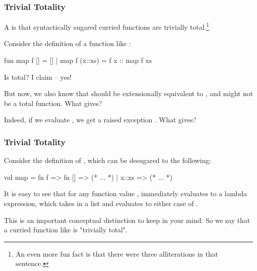 \documentclass[aspectratio=169, handout]{beamer}
\begin{document}
\begin{frame}[fragile]
  \frametitle{Trivial Totality}

  A  is that syntactically sugared curried functions are trivially total.\footnote{
    An even more fun fact is that there were three alliterations in that sentence.
  }

  \pause
  \vspace{\fill}

  Consider the definition of a function like :

  \pause
  \vspace{5pt}

  \begin{codeblock}
    fun map f [] = []
      | map f (x::xs) = f x :: map f xs
  \end{codeblock}

  \pause
  \vspace{\fill}

  Is  total? I claim -- yes!

  \pause
  \vspace{\fill}

  But now, we also know that  should be extensionally
  equivalent to \code{[f 1, f 2, f 3]}, and  might not be a total function.
  What gives?

  \pause
  \vspace{\fill}

  Indeed, if we evaluate , we get a
  raised exception . What gives?
\end{frame}

\begin{frame}[fragile]
  \frametitle{Trivial Totality}


  \pause
  \vspace{\fill}

  Consider the definition of , which can be desugared to the following:
  \begin{codeblock}
    val map = fn f => fn [] => (* ... *) | x::xs => (* ... *)
  \end{codeblock}

  \pause
  \vspace{\fill}

  It is easy to see that for any function value ,  immediately
  evaluates to a lambda expression, which takes in a list and evaluates to either
  case of .

  \pause
  \vspace{\fill}

  This is an important conceptual distinction to keep in your mind. So we say that
  a curried function like  is "trivially total".
\end{frame}
\end{document}
